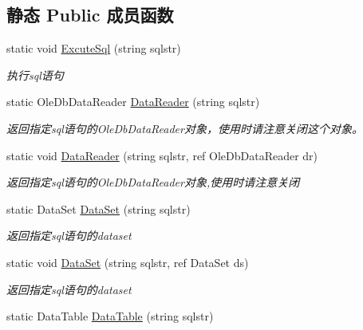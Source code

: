 \subsection*{静态 Public 成员函数}
\begin{DoxyCompactItemize}
\item 
static void \hyperlink{class_x_c_l_net_tools_1_1_data_base_1_1_access_1_1_access_helper_acb4489fbc85621f6b27e51328e60ba40}{Excute\-Sql} (string sqlstr)
\begin{DoxyCompactList}\small\item\em 执行sql语句 \end{DoxyCompactList}\item 
static Ole\-Db\-Data\-Reader \hyperlink{class_x_c_l_net_tools_1_1_data_base_1_1_access_1_1_access_helper_ac0a538c45b918a7f8d2f3e2f5a7eab30}{Data\-Reader} (string sqlstr)
\begin{DoxyCompactList}\small\item\em 返回指定sql语句的\-Ole\-Db\-Data\-Reader对象，使用时请注意关闭这个对象。 \end{DoxyCompactList}\item 
static void \hyperlink{class_x_c_l_net_tools_1_1_data_base_1_1_access_1_1_access_helper_a1eb9b1ca36a5bd3ea1a3b28d3196f826}{Data\-Reader} (string sqlstr, ref Ole\-Db\-Data\-Reader dr)
\begin{DoxyCompactList}\small\item\em 返回指定sql语句的\-Ole\-Db\-Data\-Reader对象,使用时请注意关闭 \end{DoxyCompactList}\item 
static Data\-Set \hyperlink{class_x_c_l_net_tools_1_1_data_base_1_1_access_1_1_access_helper_a0dbb31f7f093f7bffa5e3ea1e599941e}{Data\-Set} (string sqlstr)
\begin{DoxyCompactList}\small\item\em 返回指定sql语句的dataset \end{DoxyCompactList}\item 
static void \hyperlink{class_x_c_l_net_tools_1_1_data_base_1_1_access_1_1_access_helper_aa66ad22b5bfc24c630e34a62a085995f}{Data\-Set} (string sqlstr, ref Data\-Set ds)
\begin{DoxyCompactList}\small\item\em 返回指定sql语句的dataset \end{DoxyCompactList}\item 
static Data\-Table \hyperlink{class_x_c_l_net_tools_1_1_data_base_1_1_access_1_1_access_helper_aec0d16c3a29668e1298500b0f87d0f6e}{Data\-Table} (string sqlstr)

\end{DoxyCompactItemize}
